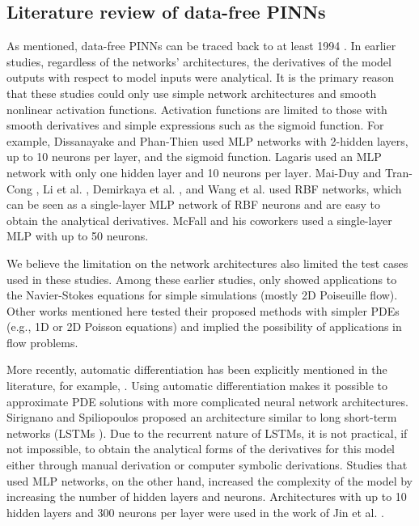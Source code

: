 \subsection*{Literature review of data-free PINNs}

As mentioned, data-free PINNs can be traced back to at least 1994 \cite{dissanayake_neural-network-based_1994}.
In earlier studies, regardless of the networks' architectures, the derivatives of the model outputs with respect to model inputs were analytical.
It is the primary reason that these studies could only use simple network architectures and smooth nonlinear activation functions. 
Activation functions are limited to those with smooth derivatives and simple expressions such as the sigmoid function.
For example, Dissanayake and Phan-Thien \cite{dissanayake_neural-network-based_1994} used MLP networks with 2-hidden layers, up to 10 neurons per layer, and the sigmoid function.
Lagaris \cite{lagaris_artificial_1998} used an MLP network with only one hidden layer and 10 neurons per layer.
Mai-Duy and Tran-Cong \cite{mai-duy_numerical_2001}, Li et al. \cite{li_numerical_2003}, Demirkaya et al. \cite{demirkaya_direct_2008}, and Wang et al. \cite{wang_meshless_2015} used RBF networks, which can be seen as a single-layer MLP network of RBF neurons and are easy to obtain the analytical derivatives.
McFall and his coworkers \cite{McFall2009,mcfall_solving_2010} used a single-layer MLP with up to 50 neurons.

We believe the limitation on the network architectures also limited the test cases used in these studies.
Among these earlier studies, only \cite{demirkaya_direct_2008,mcfall_solving_2010,wang_meshless_2015} showed applications to the Navier-Stokes equations for simple simulations (mostly 2D Poiseuille flow). 
Other works mentioned here tested their proposed methods with simpler PDEs (e.g., 1D or 2D Poisson equations) and implied the possibility of applications in flow problems.

More recently, automatic differentiation has been explicitly mentioned in the literature, for example, \cite{berg_unified_2018,sirignano_dgm:_2018,dockhorn_discussion_2019,raissi_physics-informed_2017,raissi_physics-informed_2019,jin_nsfnets_2020,lu_deepxde:_2021,cai_physics-informed_2021}.
Using automatic differentiation makes it possible to approximate PDE solutions with more complicated neural network architectures.
Sirignano and Spiliopoulos \cite{sirignano_dgm:_2018} proposed an architecture similar to long short-term networks (LSTMs \cite{hochreiter_long_1997}).
Due to the recurrent nature of LSTMs, it is not practical, if not impossible, to obtain the analytical forms of the derivatives for this model either through manual derivation or computer symbolic derivations.
Studies that used MLP networks, on the other hand, increased the complexity of the model by increasing the number of hidden layers and neurons.
Architectures with up to 10 hidden layers and 300 neurons per layer were used in the work of Jin et al. \cite{jin_nsfnets_2020}.


